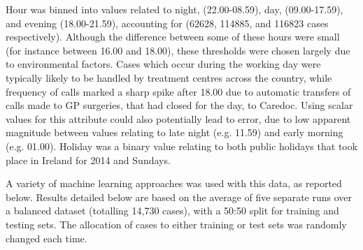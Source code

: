 Hour was binned into values related to night, (22.00-08.59), day, (09.00-17.59), and evening (18.00-21.59), accounting for (62628, 114885, and 116823 cases respectively). Although the difference between some of these hours were small (for instance between 16.00 and 18.00), these thresholds were chosen largely due to environmental factors. Cases which occur during the working day were typically likely to be handled by treatment centres across the country, while frequency of calls marked a sharp spike after 18.00 due to automatic transfers of calls made to GP surgeries, that had closed for the day, to Caredoc. Using scalar values for this attribute could also potentially lead to error, due to low apparent magnitude between values relating to late night (e.g. 11.59) and early morning (e.g. 01.00). Holiday was a binary value relating to both public holidays that took place in Ireland for 2014 and Sundays. 

A variety of machine learning approaches was used with this data, as reported below. Results detailed below are based on the average of five separate runs over a balanced dataset (totalling 14,730 cases), with a 50:50 split for training and testing sets. The allocation of cases to either training or test sets was randomly changed each time.


 
 
 

